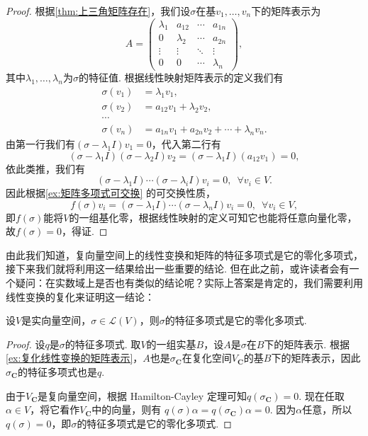 \begin{enumerate}
          \begin{proof}
              根据\autoref{thm:上三角矩阵存在}，我们设$\sigma$在基$v_1,\ldots,v_n$下的矩阵表示为
              \[A=\begin{pmatrix}
                      \lambda_1 & a_{12}    & \cdots & a_{1n}    \\
                      0         & \lambda_2 & \cdots & a_{2n}    \\
                      \vdots    & \vdots    & \ddots & \vdots    \\
                      0         & 0         & \cdots & \lambda_n
                  \end{pmatrix},\]
              其中$\lambda_1,\ldots,\lambda_n$为$\sigma$的特征值. 根据线性映射矩阵表示的定义我们有
              \begin{align*}
                  \sigma(v_1) & =\lambda_1v_1,                            \\
                  \sigma(v_2) & =a_{12}v_1+\lambda_2v_2,                  \\
                  \cdots                                                  \\
                  \sigma(v_n) & =a_{1n}v_1+a_{2n}v_2+\cdots+\lambda_nv_n.
              \end{align*}
              由第一行我们有$(\sigma-\lambda_1 I)v_1=0$，代入第二行有
              \[(\sigma-\lambda_1 I)(\sigma-\lambda_2 I)v_2=(\sigma-\lambda_1 I)(a_{12}v_1)=0,\]
              依此类推，我们有
              \[(\sigma-\lambda_1 I)\cdots(\sigma-\lambda_i I)v_i=0,\enspace\forall v_i\in V.\]
              因此根据\autoref{ex:矩阵多项式可交换} 的可交换性质，
              \[f(\sigma)v_i=(\sigma-\lambda_1 I)\cdots(\sigma-\lambda_n I)v_i=0,\enspace\forall v_i\in V,\]
              即$f(\sigma)$能将$V$的一组基化零，根据线性映射的定义可知它也能将任意向量化零，故$f(\sigma)=0$，得证.
          \end{proof}
\end{enumerate}

由此我们知道，复向量空间上的线性变换和矩阵的特征多项式是它的零化多项式，接下来我们就将利用这一结果给出一些重要的结论. 但在此之前，或许读者会有一个疑问：在实数域上是否也有类似的结论呢？实际上答案是肯定的，我们需要利用线性变换的复化来证明这一结论：
\begin{theorem}{}{}
    设$V$是实向量空间，$\sigma\in \mathcal{L}(V)$，则$\sigma$的特征多项式是它的零化多项式.
\end{theorem}
\begin{proof}
    设$q$是$\sigma$的特征多项式. 取$V$的一组实基$B$，设$A$是$\sigma$在$B$下的矩阵表示. 根据\autoref{ex:复化线性变换的矩阵表示}，$A$也是$\sigma_{\mathbf{C}}$在复化空间$V_{\mathbf{C}}$的基$B$下的矩阵表示，因此$\sigma_{\mathbf{C}}$的特征多项式也是$q$.

    由于$V_{\mathbf{C}}$是复向量空间，根据 Hamilton-Cayley 定理可知$q(\sigma_{\mathbf{C}})=0$. 现在任取$\alpha\in V$，将它看作$V_{\mathbf{C}}$中的向量，则有 $q(\sigma)\alpha=q(\sigma_{\mathbf{C}})\alpha=0$. 因为$\alpha$任意，所以$q(\sigma)=0$，即$\sigma$的特征多项式是它的零化多项式.
\end{proof}

